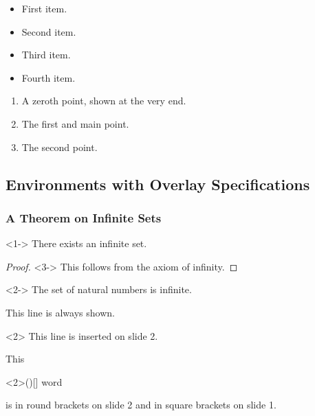          \def\colorize<#1>{%
           \temporal<#1>{\color{red!50}}{\color{black}}{\color{black!50}}}
           \begin{frame}
           \begin{itemize}
           \colorize<1> \item First item.
           \colorize<2> \item Second item.
           \colorize<3> \item Third item.
           \colorize<4> \item Fourth item.
           \end{itemize}
           \end{frame}
           \begin{frame}
           \begin{enumerate}
           \item<3-| alert@3>[0.] A zeroth point, shown at the very end.
           \item<1-| alert@1> The first and main point.
           \item<2-| alert@2> The second point.
           \end{enumerate}
           \end{frame}
           \subsection{Environments with Overlay Specifications}
           \begin{frame}
           \frametitle{A Theorem on Infinite Sets}
           \begin{theorem}<1->
           There exists an infinite set.
           \end{theorem}
           \begin{proof}<3->
           This follows from the axiom of infinity.
           \end{proof}
           \begin{example}<2->
           The set of natural numbers is infinite.
           \end{example}
           \end{frame}
           \begin{frame}
           This line is always shown.
           \begin{onlyenv}<2>
           This line is inserted on slide 2.
           \end{onlyenv}
           \end{frame}
           \begin{frame}
           This
           \begin{altenv}<2>{(}{)}{[}{]}
           word
           \end{altenv}
           is in round brackets on slide 2 and in square brackets on slide 1.
           \end{frame}
